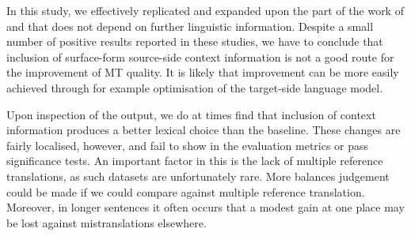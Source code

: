 
In this study, we effectively replicated and expanded upon the part of the work
of \cite{Stroppa+07} and \cite{Rejwanul+11} that does not depend on further
linguistic information. Despite a small number of positive results reported in these
studies, we have to conclude that inclusion of surface-form source-side context
information is not a good route for the improvement of MT quality. It is likely
that improvement can be more easily achieved through for example optimisation
of the target-side language model.

Upon inspection of the output, we do at times find that inclusion of context
information produces a better lexical choice than the baseline. These changes
are fairly localised, however, and fail to show in the evaluation metrics or
pass significance tests. An important factor in this is the lack of multiple
reference translations, as such datasets are unfortunately rare. More balances
judgement could be made if we could compare against multiple reference
translation. Moreover, in longer sentences it often occurs that a modest gain
at one place may be lost against mistranslations elsewhere.

